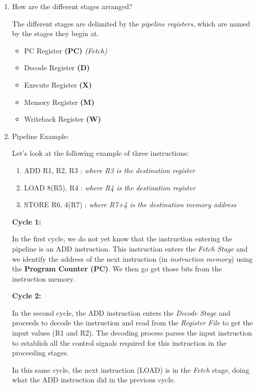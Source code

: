 \documentclass[12pt]{article}
\newenvironment{QandA}{\begin{enumerate}[label=\bfseries\arabic*.]\bfseries}
                      {\end{enumerate}}
\newenvironment{answered}{\par\quad\normalfont}{}
\begin{document}
\begin{QandA}
    \item How are the different stages arranged?
    \begin{answered}
    The different stages are delimited by the \textit{pipeline registers}, which are named by the stages they begin at.
    \begin{itemize}
        \item PC Register \textbf{(PC)} \textit{(Fetch)}
        \item Decode Register \textbf{(D)}
        \item Execute Register \textbf{(X)}
        \item Memory Register \textbf{(M)}
        \item Writeback Register \textbf{(W)}
    \end{itemize}
    \end{answered}
    
    \item Pipeline Example:
    \begin{answered}
    Let's look at the following example of three instructions:
    \begin{enumerate}
        \item ADD R1, R2, R3 : \textit{where R3 is the destination register}
        \item LOAD 8(R5), R4 : \textit{where R4 is the destination register}
        \item STORE R6, 4(R7) : \textit{where R7+4 is the destination memory address}
    \end{enumerate}
    
    \textbf{Cycle 1:} 
    
    In the first cycle, we do not yet know that the instruction entering the pipeline is an ADD instruction. This instruction enters the \textit{Fetch Stage} and we identify the address of the next instruction (in \textit{instruction memory}) using the \textbf{Program Counter (PC)}. We then go get those bits from the instruction memory.
    
    \textbf{Cycle 2:} 
    
    In the second cycle, the ADD instruction enters the \textit{Decode Stage} and proceeds to decode the instruction and read from the \textit{Register File} to get the input values (R1 and R2). The decoding process parses the input instruction to establish all the control signals required for this instruction in the proceeding stages.
    
    \quad In this same cycle, the next instruction (LOAD) is in the \textit{Fetch} stage, doing what the ADD instruction did in the previous cycle.
    

\end{answered}
\end{QandA}
\end{document}
